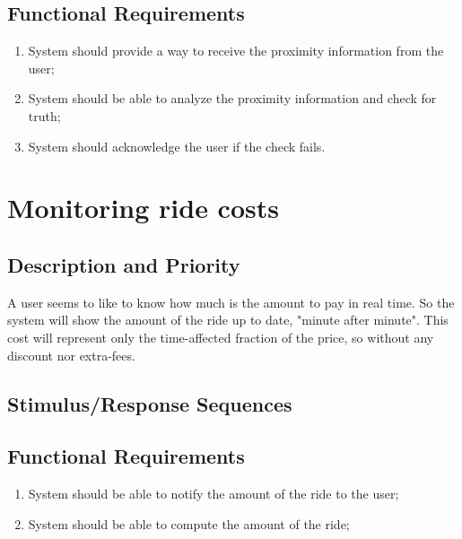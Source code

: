 \documentclass{scrreprt}
\begin{document}
\subsection{Functional Requirements}
\begin{enumerate}[label=R\arabic*.,resume]
\item System should provide a way to receive the proximity information from the user;
\item System should be able to analyze the proximity information and check for truth;
\item System should acknowledge the user if the check fails.

\end{enumerate}

\section{Monitoring ride costs}
\subsection{Description and Priority}
A user seems to like to know how much is the amount to pay in real time. So the system will show the amount of the ride up to date, "minute after minute".
This cost will represent only the time-affected fraction of the price, so without any discount nor extra-fees.
 
\subsection{Stimulus/Response Sequences}
\subsection{Functional Requirements}
\begin{enumerate}[label=R\arabic*.,resume]
\item System should be able to notify the amount of the ride to the user;
\item System should be able to compute the amount of the ride;
\end{enumerate}
\end{document}
